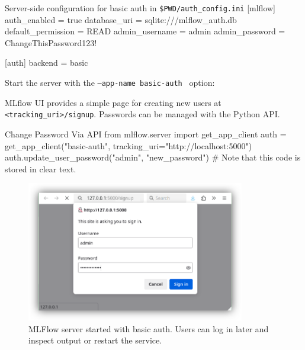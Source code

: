 \begin{codeonly}{Server-side configuration for basic auth in \texttt{\${PWD}/auth\_config.ini}}
[mlflow]
auth_enabled = true
database_uri = sqlite:///mlflow_auth.db
default_permission = READ
admin_username = admin
admin_password = ChangeThisPassword123!

[auth]
backend = basic
\end{codeonly}

Start the server with the \texttt{--app-name basic-auth } option:

MLflow UI provides a simple page for creating new users at \texttt{<tracking\_uri>/signup}. Passwords can be managed with the Python API.

\begin{codeonly}{Change Password Via API}
from mlflow.server import get_app_client
auth = get_app_client("basic-auth", tracking_uri="http://localhost:5000")
auth.update_user_password("admin", "new_password") # Note that this code is stored in clear text.
\end{codeonly}

\begin{figure}[htbp]
    \centering
    \includegraphics[width=0.85\textwidth]{images/mlflow_auth.png}
    \caption{MLFlow server started with basic auth. Users can log in later and inspect output or restart the service.}
    \label{fig:mlflow_auth}
\end{figure}

%
